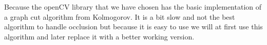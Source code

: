 \documentclass[12pt,draft,a4paper]{article}
\begin{document}
Because the openCV library that we have chosen has the basic
implementation of a graph cut algorithm from Kolmogorov. It is a bit
slow and not the best algorithm to handle occlusion but because it is
easy to use we will at first use this algorithm and later replace it
with a better working version.


\end{document}
